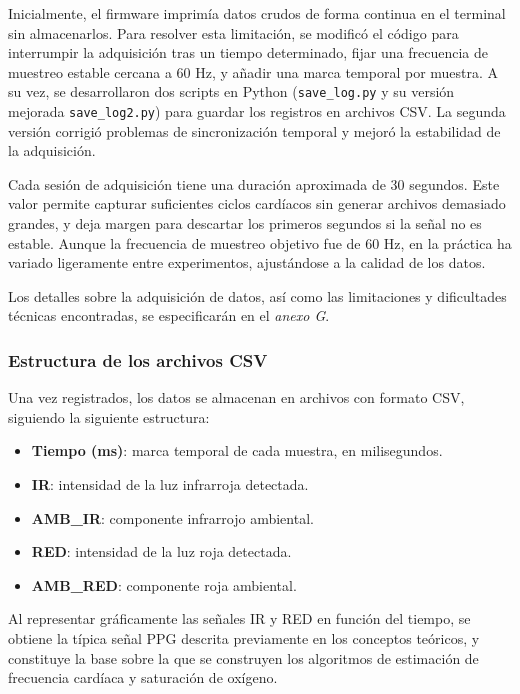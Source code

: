 Inicialmente, el firmware imprimía datos crudos de forma continua en el terminal sin almacenarlos. Para resolver esta limitación, se modificó el código para interrumpir la adquisición tras un tiempo determinado, fijar una frecuencia de muestreo estable cercana a 60 Hz, y añadir una marca temporal por muestra. A su vez, se desarrollaron dos scripts en Python (\texttt{save\_log.py} y su versión mejorada \texttt{save\_log2.py}) para guardar los registros en archivos CSV. La segunda versión corrigió problemas de sincronización temporal y mejoró la estabilidad de la adquisición.

Cada sesión de adquisición tiene una duración aproximada de 30 segundos. Este valor permite capturar suficientes ciclos cardíacos sin generar archivos demasiado grandes, y deja margen para descartar los primeros segundos si la señal no es estable. Aunque la frecuencia de muestreo objetivo fue de 60 Hz, en la práctica ha variado ligeramente entre experimentos, ajustándose a la calidad de los datos.

Los detalles sobre la adquisición de datos, así como las limitaciones y dificultades técnicas encontradas, se especificarán en el \textit{anexo G}.

\subsubsection{Estructura de los archivos CSV}

Una vez registrados, los datos se almacenan en archivos con formato CSV, siguiendo la siguiente estructura:

\begin{itemize}
    \item \textbf{Tiempo (ms)}: marca temporal de cada muestra, en milisegundos.
    \item \textbf{IR}: intensidad de la luz infrarroja detectada.
    \item \textbf{AMB\_IR}: componente infrarrojo ambiental.
    \item \textbf{RED}: intensidad de la luz roja detectada.
    \item \textbf{AMB\_RED}: componente roja ambiental.
\end{itemize}

Al representar gráficamente las señales IR y RED en función del tiempo, se obtiene la típica señal PPG descrita previamente en los conceptos teóricos, y constituye la base sobre la que se construyen los algoritmos de estimación de frecuencia cardíaca y saturación de oxígeno.

